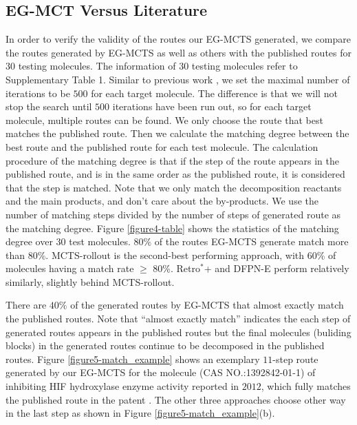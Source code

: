 \documentclass[sn-mathphys,Numbered]{sn-jnl}
\begin{document}
\subsection{EG-MCT Versus Literature}
In order to verify the validity of the routes our EG-MCTS generated, we compare the routes generated by EG-MCTS as well as others with the published routes for $30$ testing molecules. The information of $30$ testing molecules refer to Supplementary Table 1. Similar to previous work \cite{retro2020,2022}, we set the maximal number of iterations to be $500$ for each target molecule. The difference is that we will not stop the search until $500$ iterations have been run out, so for each target molecule, multiple routes can be found. We only choose the route that best matches the published route.
Then we calculate the matching degree between the best route and the published route for each test molecule.
The calculation procedure of the matching degree is that if the step of the route appears in the published route, and is in the same order as the published route, it is considered that the step is matched. Note that we only match the decomposition reactants and the main products, and don't care about the by-products. We use the number of matching steps divided by the number of steps of generated route as the matching degree. Figure \ref{figure4-table} shows the statistics of the matching degree over $30$ test molecules. 
80\% of the routes EG-MCTS generate match more than 80\%.
MCTS-rollout is the second-best performing approach, with 60\% of molecules having a match rate $\geq$ 80\%. Retro$^*$+ and DFPN-E perform relatively similarly, slightly behind MCTS-rollout.




There are $40\%$ of the generated routes by EG-MCTS that almost exactly match the published routes. Note that ``almost exactly match'' indicates the each step of generated routes appears in the published routes but the final molecules (buliding blocks) in the generated routes continue to be decomposed in the published routes. Figure \ref{figure5-match_example} shows an exemplary $11$-step route generated by our EG-MCTS for the molecule (CAS NO.:1392842-01-1) of inhibiting HIF hydroxylase enzyme activity reported in $2012$, which fully matches the published route in the patent \citep{paten-thesame}.
The other three approaches choose other way in the last step as shown in Figure \ref{figure5-match_example}(b).
\end{document}
